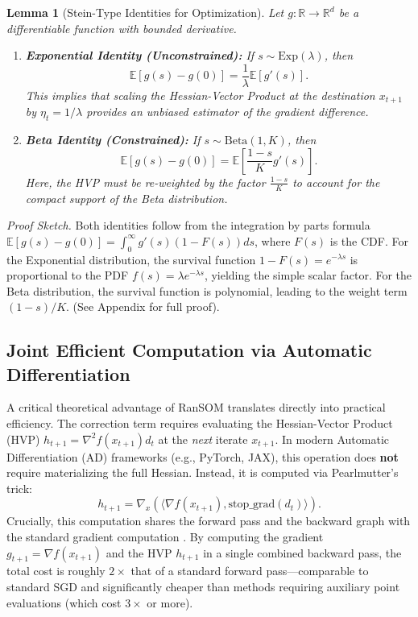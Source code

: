 \documentclass{article}
\theoremstyle{plain}
\newtheorem{lemma}[theorem]{Lemma}
\theoremstyle{definition}
\theoremstyle{remark}
\begin{document}
\begin{lemma}[Stein-Type Identities for Optimization]
\label{lemma:stein}
Let $g: \mathbb{R} \to \mathbb{R}^d$ be a differentiable function with bounded derivative.
\begin{enumerate}
    \item \textbf{Exponential Identity (Unconstrained):} If $s \sim \mathrm{Exp}(\lambda)$, then
    \begin{equation}
        \mathbb{E}[g(s) - g(0)] = \frac{1}{\lambda} \mathbb{E}[g'(s)].
    \end{equation}
    This implies that scaling the Hessian-Vector Product at the destination $x_{t+1}$ by $\eta_t = 1/\lambda$ provides an unbiased estimator of the gradient difference.
    
    \item \textbf{Beta Identity (Constrained):} If $s \sim \mathrm{Beta}(1, K)$, then
    \begin{equation}
        \mathbb{E}[g(s) - g(0)] = \mathbb{E}\left[\frac{1-s}{K} g'(s)\right].
    \end{equation}
    Here, the HVP must be re-weighted by the factor $\frac{1-s}{K}$ to account for the compact support of the Beta distribution.
\end{enumerate}
\end{lemma}
\textit{Proof Sketch.} Both identities follow from the integration by parts formula $\mathbb{E}[g(s)-g(0)] = \int_0^\infty g'(s) (1 - F(s)) ds$, where $F(s)$ is the CDF. For the Exponential distribution, the survival function $1-F(s) = e^{-\lambda s}$ is proportional to the PDF $f(s) = \lambda e^{-\lambda s}$, yielding the simple scalar factor. For the Beta distribution, the survival function is polynomial, leading to the weight term $(1-s)/K$. (See Appendix for full proof).

\subsection{Joint Efficient Computation via Automatic Differentiation}
A critical theoretical advantage of RanSOM translates directly into practical efficiency. The correction term requires evaluating the Hessian-Vector Product (HVP) $h_{t+1} = \nabla^2 f(x_{t+1}) d_t$ at the \textit{next} iterate $x_{t+1}$.
In modern Automatic Differentiation (AD) frameworks (e.g., PyTorch, JAX), this operation does \textbf{not} require materializing the full Hessian. Instead, it is computed via Pearlmutter's trick:
\begin{equation}
    h_{t+1} = \nabla_{x} (\langle \nabla f(x_{t+1}), \text{stop\_grad}(d_t) \rangle).
\end{equation}
Crucially, this computation shares the forward pass and the backward graph with the standard gradient computation . By computing the gradient $g_{t+1} = \nabla f(x_{t+1})$ and the HVP $h_{t+1}$ in a single combined backward pass, the total cost is roughly $2\times$ that of a standard forward pass—comparable to standard SGD and significantly cheaper than methods requiring auxiliary point evaluations (which cost $3\times$ or more).
\end{document}
